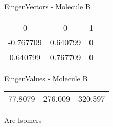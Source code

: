 \begin{multicols}{2}
\begin{center}
\vtab
 EingenVectors - Molecule B     \\
\vtab
\begin{tabular}{|c c c|}
0	 & 	0	 & 	1	 \\
-0.767709	 & 	0.640799	 & 	0	 \\
0.640799	 & 	0.767709	 & 	0
\end{tabular}

\vtab
 EingenValues - Molecule B     \\
\vtab
\begin{tabular}{|c c c|}
77.8079	 & 	276.009	 & 	320.597
\end{tabular}

\end{center}
\end{multicols}
\begin{center}
\vtab
\vtab
\textcolor{NavyBlue}{\Large Are Isomers}
\end{center}
\newpage

